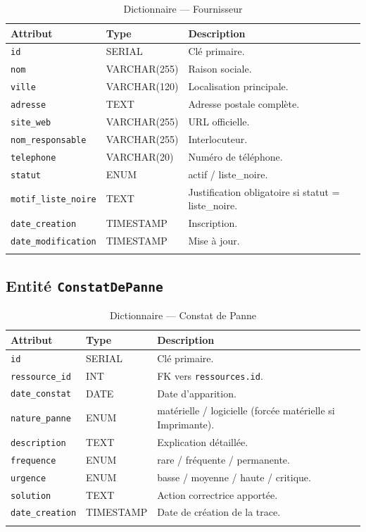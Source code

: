 \documentclass[a4paper,11pt,openany]{report}
\begin{document}
\begin{longtable}{p{4cm} p{3.5cm} p{6cm}}
\toprule
\textbf{Attribut} & \textbf{Type} & \textbf{Description} \\
\midrule
\endhead
\texttt{id} & SERIAL & Clé primaire. \\
\texttt{nom} & VARCHAR(255) & Raison sociale. \\
\texttt{ville} & VARCHAR(120) & Localisation principale. \\
\texttt{adresse} & TEXT & Adresse postale complète. \\
\texttt{site\_web} & VARCHAR(255) & URL officielle. \\
\texttt{nom\_responsable} & VARCHAR(255) & Interlocuteur. \\
\texttt{telephone} & VARCHAR(20) & Numéro de téléphone. \\
\texttt{statut} & ENUM & actif / liste\_noire. \\
\texttt{motif\_liste\_noire} & TEXT & Justification obligatoire
si statut = liste\_noire. \\
\texttt{date\_creation} & TIMESTAMP & Inscription. \\
\texttt{date\_modification} & TIMESTAMP & Mise à jour. \\
\bottomrule
\caption{Dictionnaire --- Fournisseur}
\label{tab:dictFournisseur}
\end{longtable}

\subsection{Entité \texttt{ConstatDePanne}}

\begin{longtable}{p{4cm} p{3.5cm} p{6cm}}
\toprule
\textbf{Attribut} & \textbf{Type} & \textbf{Description} \\
\midrule
\endhead
\texttt{id} & SERIAL & Clé primaire. \\
\texttt{ressource\_id} & INT & FK vers \texttt{ressources.id}. \\
\texttt{date\_constat} & DATE & Date d'apparition. \\
\texttt{nature\_panne} & ENUM & matérielle / logicielle (forcée
matérielle si Imprimante). \\
\texttt{description} & TEXT & Explication détaillée. \\
\texttt{frequence} & ENUM & rare / fréquente / permanente. \\
\texttt{urgence} & ENUM & basse / moyenne / haute / critique. \\
\texttt{solution} & TEXT & Action correctrice apportée. \\
\texttt{date\_creation} & TIMESTAMP & Date de création de la
trace. \\
\bottomrule
\caption{Dictionnaire --- Constat de Panne}
\label{tab:dictConstat}
\end{longtable}
\end{document}
